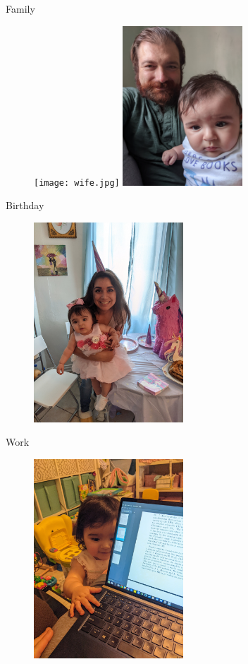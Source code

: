 \documentclass{beamer}
\begin{document}
\begin{frame}{Family}
\begin{figure}
\texttt{[image: wife.jpg]}
\includegraphics[width=0.4\textwidth]{green.jpg}
\end{figure}
\end{frame}

\begin{frame}{Birthday}
\begin{figure}
\includegraphics[width=0.5\textwidth]{bday.jpg}
\end{figure}
\end{frame}

\begin{frame}{Work}
\begin{figure}
\includegraphics[width=0.5\textwidth]{work.jpg}
\end{figure}
\end{frame}
\end{document}
